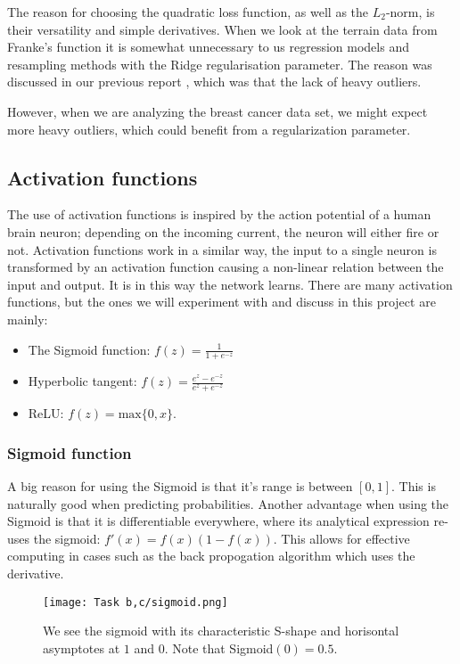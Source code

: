 \documentclass[a4paper, UKenglish, 11pt]{uiomaster}
\begin{document}
The reason for choosing the quadratic loss function, as well as the $L_2$-norm, is their versatility and simple derivatives. When we look at the terrain data from Franke's function it is somewhat unnecessary to us regression models and resampling methods with the Ridge regularisation parameter. The reason was discussed in our previous report \cite{97}, which was that the lack of heavy outliers.

However, when we are analyzing the breast cancer data set, we might expect more heavy outliers, which could benefit from a regularization parameter.

\subsection*{Activation functions}

The use of activation functions is inspired by the action potential of a human brain neuron; depending on the incoming current, the neuron will either fire or not. Activation functions work in a similar way, the input to a single neuron is transformed by an activation function causing a non-linear relation between the input and output. It is in this way the network learns. There are many activation functions, but the ones we will experiment with and discuss in this project are mainly:

\begin{itemize}
    \item The Sigmoid function: $f(z)=\frac{1}{1+e^{-z}}$
    \item Hyperbolic tangent: $f(z)=\frac{e^{z}-e^{-z}}{e^{z}+e^{-z}}$
    \item ReLU: $f(z)=\text{max}\{0,x\}$.
\end{itemize}

\subsubsection*{Sigmoid function}

A big reason for using the Sigmoid is that it's range is between $[0, 1]$. This is naturally good when predicting probabilities. Another advantage when using the Sigmoid is that it is differentiable everywhere, where its analytical expression re-uses the sigmoid: $f'(x)=f(x)(1-f(x))$. This allows for effective computing in cases such as the back propogation algorithm which uses the derivative.

\begin{figure}[H]
    \centering
    \texttt{[image: Task b,c/sigmoid.png]}
    \caption{We see the sigmoid with its characteristic S-shape and horisontal asymptotes at $1$ and $0$. Note that Sigmoid$(0)=0.5$.}
    \label{fig:Sigmoid}
\end{figure}
\end{document}
